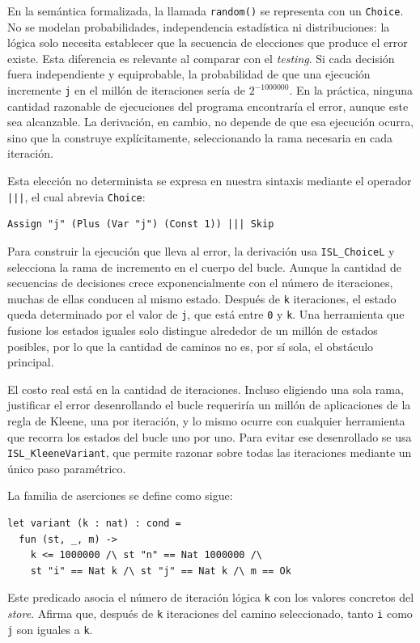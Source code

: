 \documentclass[a4paper,	11pt]{report}
\begin{document}
En la semántica formalizada,
la llamada \lstinline|random()| se representa con un \lstinline|Choice|.
No se modelan probabilidades,
independencia estadística ni distribuciones:
la lógica solo necesita establecer que la secuencia de elecciones que produce el error existe.
Esta diferencia es relevante al comparar con el \emph{testing}.
Si cada decisión fuera independiente y equiprobable,
la probabilidad de que una ejecución incremente \lstinline|j| en el millón de iteraciones sería de $2^{-1000000}$.
En la práctica,
ninguna cantidad razonable de ejecuciones del programa encontraría el error,
aunque este sea alcanzable.
La derivación,
en cambio,
no depende de que esa ejecución ocurra,
sino que la construye explícitamente,
seleccionando la rama necesaria en cada iteración.

Esta elección no determinista se expresa en nuestra sintaxis mediante el operador \lstinline{|||},
el cual abrevia \lstinline|Choice|:

\begin{lstlisting}
Assign "j" (Plus (Var "j") (Const 1)) ||| Skip
\end{lstlisting}

Para construir la ejecución que lleva al error,
la derivación usa \lstinline|ISL_ChoiceL| y selecciona la rama de incremento en el cuerpo del bucle.
Aunque la cantidad de secuencias de decisiones crece exponencialmente con el número de iteraciones,
muchas de ellas conducen al mismo estado.
Después de \lstinline|k| iteraciones,
el estado queda determinado por el valor de \lstinline|j|,
que está entre \lstinline|0| y \lstinline|k|.
Una herramienta que fusione los estados iguales solo distingue alrededor de un millón de estados posibles,
por lo que la cantidad de caminos no es,
por sí sola, el obstáculo principal.

El costo real está en la cantidad de iteraciones.
Incluso eligiendo una sola rama,
justificar el error desenrollando el bucle requeriría un millón de aplicaciones de la regla de Kleene,
una por iteración,
y lo mismo ocurre con cualquier herramienta que recorra los estados del bucle uno por uno.
Para evitar ese desenrollado se usa \lstinline|ISL_KleeneVariant|,
que permite razonar sobre todas las iteraciones mediante un único paso paramétrico.

La familia de aserciones se define como sigue:

\begin{lstlisting}
let variant (k : nat) : cond =
  fun (st, _, m) ->
    k <= 1000000 /\ st "n" == Nat 1000000 /\
    st "i" == Nat k /\ st "j" == Nat k /\ m == Ok
\end{lstlisting}
Este predicado asocia el número de iteración lógica \lstinline|k| con los valores concretos del \emph{store}.
Afirma que,
después de \lstinline|k| iteraciones del camino seleccionado,
tanto \lstinline|i| como \lstinline|j| son iguales a \lstinline|k|.
\end{document}
